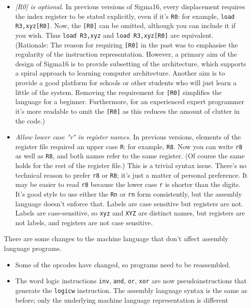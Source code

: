 \documentclass[11pt]{article}
\begin{document}
\begin{itemize}
\item \emph{[R0] is optional.} In previous versions of Sigma16, every
displacement requires the index register to be stated explicitly,
even if it's \texttt{R0}: for example, \texttt{load R3,xyz[R0]}.  Now, the \texttt{[R0]}
can be omitted, although you can include it if you wish.  Thus \texttt{load
  R3,xyz} and \texttt{load R3,xyz[R0]} are equivalent.  (Rationale: The
reason for requiring \texttt{[R0]} in the past was to emphasise the
regularity of the instruction representation.  However, a primary
aim of the design of Sigma16 is to provide subsetting of the
architecture, which supports a spiral approach to learning computer
architecture.  Another aim is to provide a good platform for schools
or other students who will just learn a little of the system.
Removing the requirement for \texttt{[R0]} simplifies the language for a
beginner.  Furthermore, for an experienced expert programmer it's
more readable to omit the \texttt{[R0]} as this reduces the amount of
clutter in the code.)

\item \emph{Allow lower case "r" in register names.} In previous versions,
elements of the register file required an upper case \texttt{R}: for
example, \texttt{R8}.  Now you can write \texttt{r8} as well as \texttt{R8}, and both
names refer to the same register.  (Of course the same holds for the
rest of the register file.)  This is a trivial syntax issue.
There's no technical reason to prefer \texttt{r8} or \texttt{R8}; it's just a
matter of personal preference.  It may be easier to read \texttt{r8}
because the lower case \texttt{r} is shorter than the digits.  It's good
style to use either the \texttt{Rn} or \texttt{rn} form consistently, but the
assembly language doesn't enforce that. Labels are case sensitive but
registers are not.    Labels are case-sensitive,
so \texttt{xyz} and \texttt{XYZ} are distinct names, but registers are not labels,
and registers are not case sensitive.
\end{itemize}

There are some changes to the machine language that don't affect
assembly language programs.

\begin{itemize}
\item Some of the opcodes have changed, so programs need to be
reassembled.

\item The word logic instructions \texttt{inv}, \texttt{and}, \texttt{or}, \texttt{xor} are now
pseudoinstructions that generate the \texttt{logicw} instruction.  The
assembly language syntax is the same as before; only the underlying
machine language representation is different
\end{itemize}
\end{document}
